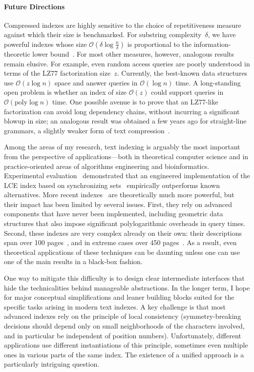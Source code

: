\documentclass[a4paper,11pt]{article}
\newcommand{\Oh}{\mathcal{O}}
\begin{document}
\paragraph*{Future Directions}
Compressed indexes are highly sensitive to the choice of repetitiveness measure against which their size is benchmarked.
For substring complexity~$\delta$, we have powerful indexes whose size $\Oh(\delta \log\frac{n}{\delta})$ is proportional to the information-theoretic lower bound~\cite{TIT22,FOCS2023b}.
For most other measures, however, analogous results remain elusive.  
For example, even random access queries are poorly understood in terms of the LZ77 factorization size~$z$. 
Currently, the best-known data structures use $\Oh(z \log n)$ space and answer queries in $\Oh(\log n)$ time. 
A long-standing open problem is whether an index of size $\Oh(z)$ could support queries in $\Oh(\mathrm{poly}\log n)$ time.
One possible avenue is to prove that an LZ77-like factorization can avoid long dependency chains, without incurring a significant blowup in size; an analogous result was obtained a few years ago for straight-line grammars, a slightly weaker form of text compression~\cite{GanardiJL21}.

Among the areas of my research, text indexing is arguably the most important from the perspective of applications---both in theoretical computer science and in practice-oriented areas of algorithms engineering and bioinformatics.
Experimental evaluation~\cite{Dinklage2020} demonstrated that an engineered implementation of the LCE index based on synchronizing sets~\cite{STOC2019} empirically outperforms known alternatives.
More recent indexes~\cite{STOC2022,FOCS2023b,NT24} are theoretically much more powerful, but their impact has been limited by several issues.
First, they rely on advanced components that have never been implemented, including geometric data structures that also impose significant polylogarithmic overheads in query times. 
Second, these indexes are very complex already on their own: their descriptions span over 100 pages~\cite{FOCS2023b}, and in extreme cases over 450 pages~\cite{NT24}. 
As a result, even theoretical applications of these techniques can be daunting unless one can use one of the main results in a black-box fashion. 

One way to mitigate this difficulty is to design clear intermediate interfaces that hide the technicalities behind manageable abstractions. 
In the longer term, I hope for major conceptual simplifications and leaner building blocks suited for the specific tasks arising in modern text indexes. 
A key challenge is that most advanced indexes rely on the principle of local consistency (symmetry-breaking decisions should depend only on small neighborhoods of the characters involved, and in particular be independent of position numbers). 
Unfortunately, different applications use different instantiations of this principle, sometimes even multiple ones in various parts of the same index. 
The existence of a unified approach is a particularly intriguing question.
\end{document}
